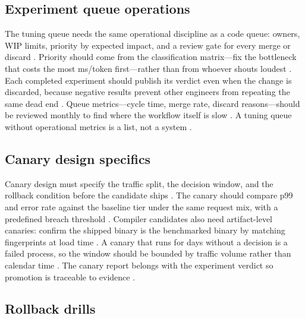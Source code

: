 \subsection{Experiment queue operations}

The tuning queue needs the same operational discipline as a code queue: owners, WIP limits, priority by expected impact, and a review gate for every merge or discard \citep{chen2020compilerbasedhardw,memoryfloor2026,patel2025llminference}. Priority should come from the classification matrix—fix the bottleneck that costs the most ms/token first—rather than from whoever shouts loudest \citep{taxbreak2026,memoryfloor2026}. Each completed experiment should publish its verdict even when the change is discarded, because negative results prevent other engineers from repeating the same dead end \citep{chen2020compilerbasedhardw,patel2025llminference}. Queue metrics—cycle time, merge rate, discard reasons—should be reviewed monthly to find where the workflow itself is slow \citep{memoryfloor2026,taxbreak2026}. A tuning queue without operational metrics is a list, not a system \citep{patel2025llminference,memoryfloor2026}.

\subsection{Canary design specifics}

Canary design must specify the traffic split, the decision window, and the rollback condition before the candidate ships \citep{patel2025llminference,kwon2023vllm,taxbreak2026}. The canary should compare p99 and error rate against the baseline tier under the same request mix, with a predefined breach threshold \citep{memoryfloor2026,patel2025llminference}. Compiler candidates also need artifact-level canaries: confirm the shipped binary is the benchmarked binary by matching fingerprints at load time \citep{chen2020compilerbasedhardw,memoryfloor2026}. A canary that runs for days without a decision is a failed process, so the window should be bounded by traffic volume rather than calendar time \citep{kwon2023vllm,patel2025llminference}. The canary report belongs with the experiment verdict so promotion is traceable to evidence \citep{memoryfloor2026,taxbreak2026}.

\subsection{Rollback drills}

